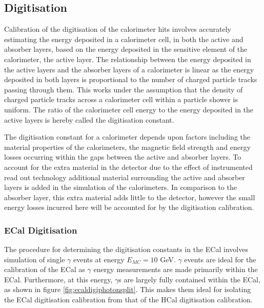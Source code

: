 \subsection{Digitisation}
\label{sec:digi}
Calibration of the digitisation of the calorimeter hits involves accurately estimating the energy deposited in a calorimeter cell, in both the active and absorber layers, based on the energy deposited in the sensitive element of the calorimeter, the active layer.  The relationship between the energy deposited in the active layers and the absorber layers of a calorimeter is linear as the energy deposited in both layers is proportional to the number of charged particle tracks passing through them.  This works under the assumption that the density of charged particle tracks across a calorimeter cell within a particle shower is uniform.  The ratio of the calorimeter cell energy to the energy deposited in the active layers is hereby called the digitisation constant.

The digitisation constant for a calorimeter depends upon factors including the material properties of the calorimeters, the magnetic field strength and energy losses occurring within the gaps between the active and absorber layers.  To account for the extra material in the detector due to the effect of instrumented read out technology additional material surrounding the active and absorber layers is added in the simulation of the calorimeters.  In comparison to the absorber layer, this extra material adds little to the detector, however the small energy losses incurred here will be accounted for by the digitisation calibration.  


\subsubsection{ECal Digitisation}
\label{sec:ecaldigi}
The procedure for determining the digitisation constants in the ECal involves simulation of single $\gamma$ events at energy $E_{MC} = 10$ GeV.  $\gamma$ events are ideal for the calibration of the ECal as $\gamma$ energy measurements are made primarily within the ECal.  Furthermore, at this energy, $\gamma$s are largely fully contained within the ECal, as shown in figure \ref{fig:ecaldigiphotonsplit}.  This makes them ideal for isolating the ECal digitisation calibration from that of the HCal digitisation calibration.   

